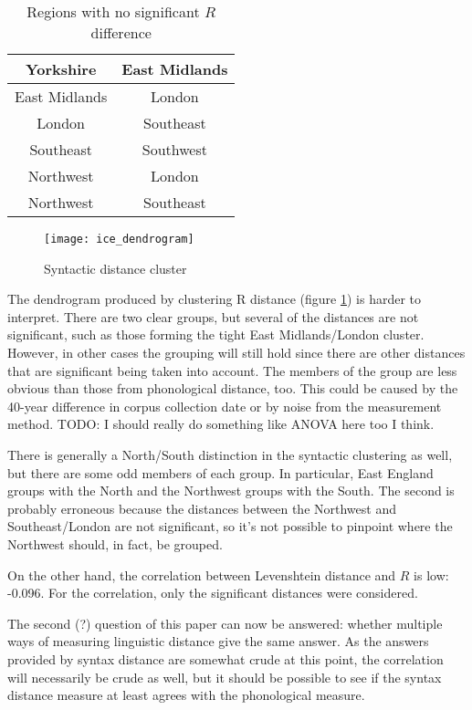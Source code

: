\documentclass[11pt]{article}
\begin{document}
\begin{table}
\begin{tabular}{cc}
  Yorkshire & East Midlands \\ \hline
  East Midlands & London \\\hline
  London & Southeast \\\hline
  Southeast & Southwest \\\hline
  Northwest & London\\\hline
  Northwest & Southeast \\\hline
\end{tabular}
\caption{Regions with no significant $R$ difference}
\label{syntax-nonsig}
\end{table}

\begin{figure}
  \texttt{[image: ice\_dendrogram]}
\caption{Syntactic distance cluster}
\label{syntax-dendrogram}
\end{figure}

The dendrogram produced by clustering R distance (figure
\ref{syntax-dendrogram}) is harder to
interpret. There are two clear groups, but several of the distances
are not significant, such as those forming the tight East
Midlands/London cluster. However, in other cases the grouping will still hold
since there are other distances that are significant being taken into
account. The members of the group are less obvious than those from
phonological distance, too. This could be caused by the 40-year
difference in corpus collection date or by noise from the measurement
method.
TODO: I should really do something like ANOVA here too I think.

There is generally a North/South distinction in the syntactic
clustering as well, but there are some odd members of each group. In
particular, East England groups with the North and the Northwest
groups with the South. The second is probably erroneous because the
distances between the Northwest and Southeast/London are not
significant, so it's not possible to pinpoint where the Northwest
should, in fact, be grouped.

On the other hand, the correlation between Levenshtein distance and
$R$ is low: -0.096. For the correlation, only the significant
distances were considered.

The second (?) question of this paper can now be answered: whether
multiple ways of measuring linguistic distance give the same
answer. As the answers provided by syntax distance are somewhat crude
at this point, the correlation will necessarily be crude as well, but
it should be possible to see if the syntax distance measure at least
agrees with the phonological measure.
\end{document}
